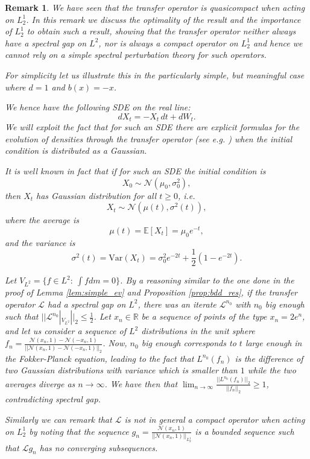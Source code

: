 \documentclass{amsart}
\newtheorem{remark}[theorem]{Remark}
\begin{document}
\begin{remark}\label{R20}
We have seen that the transfer operator is quasicompact when acting on $L^1_2$. 
In this remark we discuss the optimality of the result  and the importance of $L^1_2$ to obtain such a result, showing that the transfer operator neither always have a spectral gap on $L^2$, nor is always a compact operator on $L^1_2$ and hence we cannot rely on a simple spectral perturbation theory for such operators.

For simplicity let us illustrate this in the particularly simple, but meaningful case where $d=1$ and  $b(x)=-x$.

We hence have the following SDE on the real line:
\[
dX_t = -X_t \, dt + dW_t.
\]
We will exploit the fact that for such an SDE there are explicit formulas for the evolution of densities through the transfer operator (see e.g. \cite{gardiner2004handbook}) when the initial condition is distributed as a Gaussian.

It is well known in fact that if for such an SDE the initial condition is
\[
X_0 \sim \mathcal{N}(\mu_0, \sigma_0^2),
\]
then \( X_t \) has Gaussian distribution for all \( t \geq 0 \), i.e.
\[
X_t \sim \mathcal{N} \left( \mu(t), \sigma^2(t) \right),
\]
where the average is
$$
    \mu(t) = \mathbb{E}[X_t] = \mu_0 e^{-t},
$$
and the variance is
$$
    \sigma^2(t) = \mathrm{Var}(X_t) = \sigma_0^2 e^{-2t} + \frac{1}{2} \left( 1 - e^{-2t} \right).
$$

Let $V_{L^2}=\{f\in L^2:~\int fdm=0\}$.
By a reasoning similar to the one done in the proof of Lemma \ref{lem:simple_ev} and Proposition  \ref{prop:bdd_res}, if the transfer operator $\mathcal{L}$ had a spectral gap on $L^2$, there was an iterate $\mathcal{L}^{n_0}$ with $n_0$ big enough such that 
$||\mathcal{L}^{n_0}|_{V_{L^2}}||_2\leq
\frac{1}{2}$.
Let $x_n \in \mathbb{R} $ be a sequence of points of the type $x_n= 2e^n$, and let us consider a sequence of $L^2$ distributions in the unit sphere $f_n= \frac{\mathcal{N}(x_n, 1)-\mathcal{N}(-x_n, 1)}{||\mathcal{N}(x_n, 1)-\mathcal{N}(-x_n, 1)||_2}$.  Now, $n_0$ big enough corresponds to $t$ large enough in the Fokker-Planck equation, leading 
to the fact that $L^{n_0}(f_n)$ is the difference of two Gaussian distributions with variance which is smaller than $1$  while the two averages diverge as $n \to \infty $.  
We have then that $\lim_{n\to \infty}\frac{||L^{n_0}(f_n)||_2}{||f_n||_2}\geq 1$, contradicting spectral gap.

Similarly we can remark that   $\mathcal{L}$ is not in general a compact operator when acting  on $L^1_2$ by noting that the sequence  $g_n=\frac{\mathcal{N}(x_n, 1)}{||\mathcal{N}(x_n, 1)||_{L^1_2}}$ is a bounded sequence  such that $\mathcal{L} g_n$ has no converging subsequences.
\end{remark}
\end{document}
